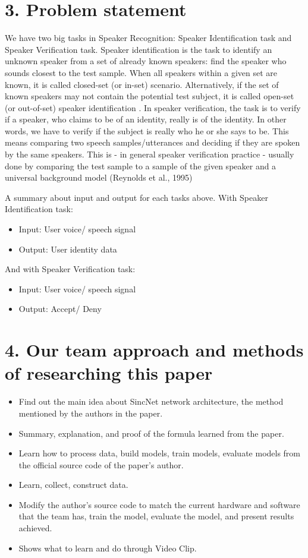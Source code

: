 \documentclass{article}
\begin{document}
	\section{3. Problem statement}
	\qquad We have two big tasks in Speaker Recognition: Speaker Identification task and Speaker Verification task. Speaker identification is the task to identify an unknown speaker from a set of already known speakers: find
	the speaker who sounds closest to the test sample. When all
	speakers within a given set are known, it is called closed-set
	(or in-set) scenario. Alternatively, if the set of known speakers
	may not contain the potential test subject, it is called open-set
	(or out-of-set) speaker identification \cite{sztaho2019deep}. In speaker verification, the task is to verify if a speaker, who claims to be of an identity, really is of the identity. In other words, we have to verify if the subject is really who he or she says to be. This means comparing two speech samples/utterances and deciding if they are spoken by the same speakers. This is - in general speaker verification practice - usually done by comparing the test sample to a sample of the given speaker and a universal background model (Reynolds et al., 1995)
	
	A summary about input and output for each tasks above. With Speaker Identification task:
	\begin{itemize}
		\item Input: User voice/ speech signal
		\item Output: User identity data
	\end{itemize}
	And with Speaker Verification task:
	\begin{itemize}
		\item Input: User voice/ speech signal
		\item Output: Accept/ Deny
	\end{itemize}

	\section{4. Our team approach and methods of researching this paper}
	\begin{itemize}
		\item Find out the main idea about SincNet network architecture, the method mentioned by the authors in the paper.
		\item Summary, explanation, and proof of the formula learned from the paper.
		\item Learn how to process data, build models, train models, evaluate models from the official source code of the paper's author.
		\item Learn, collect, construct data.
		\item Modify the author's source code to match the current hardware and software that the team has, train the model, evaluate the model, and present results achieved.
		\item Shows what to learn and do through Video Clip.
	\end{itemize}



	\nocite{*}
	\newpage\cleardoublepage
	
\end{document}
